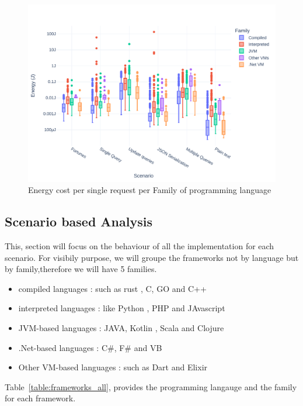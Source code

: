\begin{figure}[bht]
    \centering
    \includegraphics[width=.8\columnwidth ]{imgs/all_boxplot}
    \caption{Energy cost per single request per Family of programming language}
    \label{fig:all_boxplot}
\end{figure}



\subsection{Scenario based Analysis}
This, section will focus on the behaviour of all the implementation for each scenario. For visibily purpose, we will groupe the frameworks not by language but by family,therefore we will have 5 families.
\begin{itemize}
    \item compiled languages : such as rust , C, GO and C++
    \item interpreted languages : like Python , PHP and JAvascript
    \item JVM-based languages : JAVA, Kotlin , Scala and Clojure
    \item .Net-based languages : C\#, F\# and VB
    \item Other VM-based languages : such as Dart and Elixir
\end{itemize}

Table~\ref{table:frameworks_all}, provides the programming langauge and the family for each framework.

